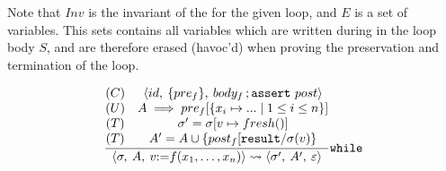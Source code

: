 \documentclass[a4paper]{article}
\DeclareMathOperator{\semi}{;}
\begin{document}
Note that $Inv$ is the invariant of the for the given loop, and $E$ is a set of
variables. This sets contains all variables which are written during in the loop
body $S$, and are therefore erased (havoc'd) when proving the preservation and
termination of the loop.

\begin{equation}
  \frac%
  {
    \begin{matrix}
      (C) &\config{id}{\{pre_f\}}{body_f\semi\mathtt{assert}~post}\\
      (U) &A \implies pre_f[\{ x_i \mapsto ... \mid 1\leq i \leq n \}]\\
      (T) & \sigma'=\sigma[v \mapsto fresh()]\\
      (T) & A' = A \cup\{post_f[ \mathtt{result} / \sigma(v)\} \\
    \end{matrix}
  }%
  {
    \config\sigma A{v \mathtt{:=} f(x_1, \ldots, x_n) }
    \leadsto
    \config{\sigma'}{A'}{\epsilon}
  }\mathtt{while}
\end{equation}
\end{document}
